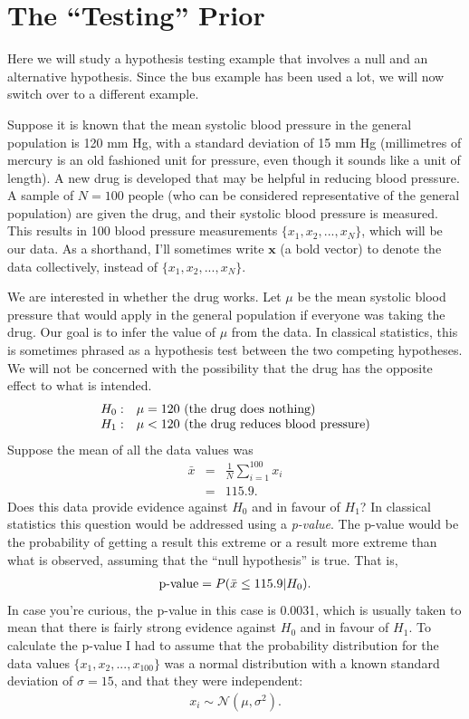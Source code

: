 \section{The ``Testing'' Prior}
Here we will study a hypothesis testing example that involves a null and an
alternative hypothesis. Since the bus example has been used a lot, we will now
switch over to a different example.

Suppose it is known that the mean systolic blood pressure
in the general population is 120 mm Hg, with a standard deviation of
15 mm Hg (millimetres of mercury is an
old fashioned unit for pressure, even though it sounds like a unit of length).
A new drug is developed that may
be helpful in reducing blood pressure. A sample of $N=100$ people
(who can be considered representative of the general population)
are given the drug, and their systolic blood pressure is measured. This results
in 100 blood pressure measurements $\{x_1, x_2, ..., x_N\}$, which will be
our data. As a shorthand, I'll sometimes write $\boldsymbol{x}$
(a bold vector) to denote the data collectively,
instead of $\{x_1, x_2, ..., x_N\}$.

We are interested in whether the drug works. Let $\mu$ be the mean systolic
blood pressure
that would apply in the general population if everyone was taking the
drug. Our goal is to infer the value of $\mu$ from the data. In classical
statistics, this is sometimes phrased as a hypothesis test between the two
competing hypotheses. We will not be concerned with the possibility that the
drug has the opposite effect to what is intended.
\begin{equation}
\begin{array}{ll}
H_0: & \mu = 120 \textnormal{ (the drug does nothing)}\\
H_1: & \mu < 120 \textnormal{ (the drug reduces blood pressure)}
\end{array}
\end{equation}
Suppose the mean of all the data values was
\begin{eqnarray}
\bar{x} &=& \frac{1}{N} \sum_{i=1}^{100} x_i\\
&=& 115.9.
\end{eqnarray} %
Does this data provide evidence against $H_0$ and in favour of $H_1$? In
classical statistics this question would be addressed using a {\it p-value}.
The p-value would be the probability of getting a result this extreme or
a result more extreme than what is observed, assuming that the ``null hypothesis''
is true. That is,
\begin{eqnarray}
\textnormal{p-value} = P(\bar{x} \leq 115.9 | H_0).
\end{eqnarray}
In case you're curious, the p-value in this case is 0.0031, which is usually
taken to mean that there is fairly strong evidence against $H_0$ and in favour
of $H_1$. To calculate the p-value I had to assume that the probability distribution
for the data values $\{x_1, x_2, ..., x_{100}\}$ was a normal distribution
with a known standard deviation of $\sigma=15$, and
that they were independent:
\begin{eqnarray}
x_i \sim \mathcal{N}(\mu, \sigma^2). \label{eq:normal}
\end{eqnarray}

